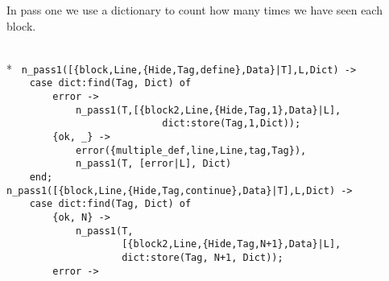 In pass one we use a dictionary to count how many times we have seen
each block.

\begin{flushleft}
\label{analysis_start}
\\*
\tt
\noindent{}%
\verb&n_pass1([{block,Line,{Hide,Tag,define},Data}|T],L,Dict) ->&\\
\noindent{}%
\verb&    case dict:find(Tag, Dict) of&\\
\noindent{}%
\verb&        error ->&\\
\noindent{}%
\verb&            n_pass1(T,[{block2,Line,{Hide,Tag,1},Data}|L],&\\
\noindent{}%
\verb&                           dict:store(Tag,1,Dict));&\\
\noindent{}%
\verb&        {ok, _} ->&\\
\noindent{}%
\verb&            error({multiple_def,line,Line,tag,Tag}),&\\
\noindent{}%
\verb&            n_pass1(T, [error|L], Dict)&\\
\noindent{}%
\verb&    end;&\\
\noindent{}%
\verb&n_pass1([{block,Line,{Hide,Tag,continue},Data}|T],L,Dict) ->&\\
\noindent{}%
\verb&    case dict:find(Tag, Dict) of&\\
\noindent{}%
\verb&        {ok, N} ->&\\
\noindent{}%
\verb&            n_pass1(T,&\\
\noindent{}%
\verb&                    [{block2,Line,{Hide,Tag,N+1},Data}|L],&\\
\noindent{}%
\verb&                    dict:store(Tag, N+1, Dict));&\\
\noindent{}%
\verb&        error ->&\\

\end{flushleft}
